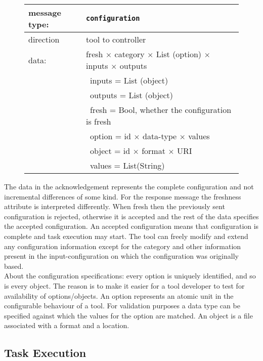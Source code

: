 \documentclass{article}
\newcommand{\msg}[1]{\texttt{#1}}
\begin{document}
   \begin{figure}[H]
    \begin{tabular}{|ll|}
     \hline
      message type:   & \msg{configuration} \\
     \hline
      direction       & tool to controller \\
      data:           & fresh $\times$ category $\times$ List (option) $\times$ inputs $\times$ outputs \\
                      & \ inputs  = List (object) \\
                      & \ outputs = List (object) \\
                      & \ fresh   = Bool, whether the configuration is fresh \\
                      & \ option  = id $\times$ data-type $\times$ values \\
                      & \ object  = id $\times$ format $\times$ URI \\
                      & \ values  = List(String) \\
     \hline
    \end{tabular}
   \end{figure}

   \noindent The data in the acknowledgement represents the complete
   configuration and not incremental differences of some kind. For the response
   message the freshness attribute is interpreted differently.  When fresh then
   the previously sent configuration is rejected, otherwise it is accepted and
   the rest of the data specifies the accepted configuration.  An accepted
   configuration means that configuration is complete and task execution may
   start.  The tool can freely modify and extend any configuration information
   except for the category and other information present in the
   input-configuration on which the configuration was originally based.
   \\[4pt]
   \noindent About the configuration specifications: every option is uniquely
   identified, and so is every object. The reason is to make it easier for a
   tool developer to test for availability of options/objects.  An option
   represents an atomic unit in the configurable behaviour of a tool. For
   validation purposes a data type can be specified against which the values
   for the option are matched. An object is a file associated with a format and
   a location.

  \subsection{Task Execution}
\end{document}
